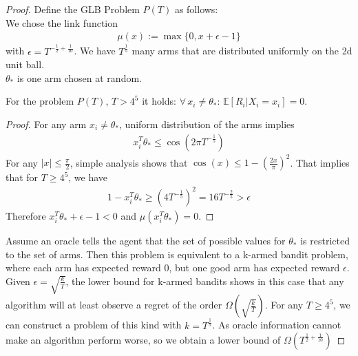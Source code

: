 \begin{proof}
    Define the GLB Problem $P(T)$ as follows:\\
    We chose the link function 
    \begin{align}
        \mu(x) := \max\{0, x+\epsilon-1\}
    \end{align}
    with $\epsilon = T^{-\frac{1}{2}+\frac{1}{10}}$.
    We have $T^{\frac{1}{5}}$ many arms that are distributed uniformly on the 2d unit ball.\\
    $\theta_*$ is one arm chosen at random.
    \begin{lemma}For the problem $P(T)$, $T>4^5$ it holds: $\forall \, x_i\neq\theta_*:\,\mathbb{E}[R_i|X_i=x_i]=0$.
    \end{lemma}
    \begin{proof}
        For any arm $x_i\neq \theta_*$, uniform distribution of the arms implies
        \begin{align*}
            x_i^T\theta_* \leq \cos(2\pi T^{-\frac{1}{5}})
        \end{align*}
        For any $|x|\leq \frac{\pi}{2}$, simple analysis shows that $\cos(x)\leq 1-(\frac{2x}{\pi})^2$. That implies that for $T\geq 4^5$, we have
        \begin{align*}
            1-x_i^T\theta_* \geq (4T^{-\frac{1}{5}})^2 = 16 T^{-\frac{2}{5}} > \epsilon 
        \end{align*}
        Therefore $x_i^T\theta_* +\epsilon-1<0$ and $\mu(x_i^T\theta_*)=0$.
    \end{proof}
    Assume an oracle tells the agent that the set of possible values for $\theta_*$ is restricted to the set of arms. Then this problem is equivalent to a k-armed bandit problem, where each arm has expected reward 0, but one good arm has expected reward $\epsilon$. Given $\epsilon=\sqrt{\frac{k}{T}}$, the lower bound for k-armed bandits shows in this case that any algorithm will at least observe a regret of the order $\Omega(\sqrt{\frac{k}{T}})$. For any $T\geq4^5$, we can construct a problem of this kind with $k=T^{\frac{1}{5}}$. As oracle information cannot make an algorithm perform worse, so we obtain a lower bound of $\Omega(T^{\frac{1}{2}+\frac{1}{10}})$
\end{proof}